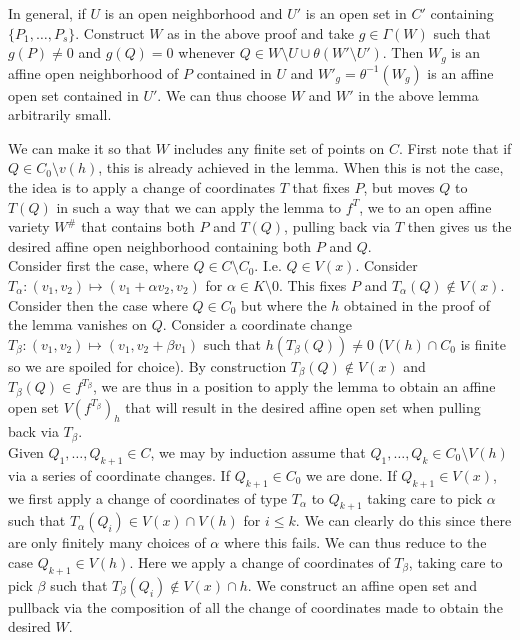         \begin{remark}
            In general, if $U$ is an open neighborhood and $U'$ is an open set in $C'$ containing $\{P_1,\dots,P_s\}$. Construct $W$ as in the above proof and take $g\in \Gamma(W)$ such that $g(P)\neq 0$ and $g(Q)=0$ whenever $Q\in W\setminus U\cup \theta(W'\setminus U')$. Then $W_g$ is an affine open neighborhood of $P$ contained in $U$ and $W'_g= \theta^{-1}(W_g)$ is an affine open set contained in $U'$. We can thus choose $W$ and $W'$ in the above lemma arbitrarily small. 
        \end{remark}
        \begin{remark}
            We can make it so that $W$ includes any finite set of points on $C$. First note that if $Q\in C_0\setminus v(h)$, this is already achieved in the lemma. When this is not the case, the idea is to apply a change of coordinates $T$ that fixes $P$, but moves $Q$ to $T(Q)$ in such a way that we can apply the lemma to $f^T$, we to an open affine variety $W^\#$ that contains both $P$ and $T(Q)$, pulling back via $T$ then gives us the desired affine open neighborhood containing both $P$ and $Q$.\\
            Consider first the case, where $Q\in C\setminus C_0$. I.e. $Q\in V(x)$. Consider $T_\alpha : (v_1,v_2) \mapsto (v_1+\alpha v_2,v_2)$ for $\alpha\in K\setminus 0$. This fixes $P$ and $T_\alpha(Q)\notin V(x)$.\\
            Consider then the case where $Q\in C_0$ but where the $h$ obtained in the proof of the lemma vanishes on $Q$. Consider a coordinate change $T_\beta: (v_1,v_2)\mapsto (v_1,v_2+\beta v_1)$ such that $h(T_\beta(Q))\neq 0$ ($V(h)\cap C_0$ is finite so we are spoiled for choice). By construction $T_\beta(Q)\notin V(x)$ and $T_\beta(Q)\in f^{T_\beta}$, we are thus in a position to apply the lemma to obtain an affine open set $V(f^{T_\beta})_h$ that will result in the desired affine open set when pulling back via $T_\beta$.\\
            Given $Q_1,\dots,Q_{k+1}\in C$, we may by induction assume that $Q_1,\dots,Q_k\in C_0 \setminus V(h)$ via a series of coordinate changes. If $Q_{k+1}\in C_0$ we are done. If $Q_{k+1}\in V(x)$, we first apply a change of coordinates of type $T_\alpha$ to $Q_{k+1}$ taking care to pick $\alpha$ such that $T_\alpha(Q_i)\in V(x)\cap V(h)$ for $i\leq k$. We can clearly do this since there are only finitely many choices of $\alpha$ where this fails. We can thus reduce to the case $Q_{k+1}\in V(h)$. Here we apply a change of coordinates of $T_\beta$, taking care to pick $\beta$ such that $T_\beta(Q_i)\notin V(x)\cap h$. We construct an affine open set and pullback via the composition of all the change of coordinates made to obtain the desired $W$.
        \end{remark}
